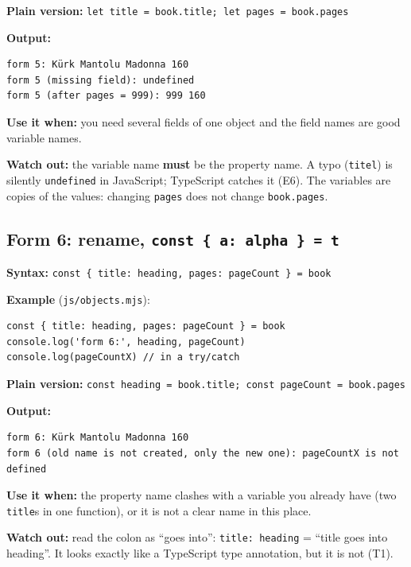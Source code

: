 \documentclass[
  10pt,
]{article}
\begin{document}
\textbf{Plain version:}
\texttt{let\ title\ =\ book.\allowbreak{}title;\ let\ pages\ =\ book.\allowbreak{}pages}

\textbf{Output:}

\begin{verbatim}
form 5: Kürk Mantolu Madonna 160
form 5 (missing field): undefined
form 5 (after pages = 999): 999 160
\end{verbatim}

\textbf{Use it when:} you need several fields of one object and the
field names are good variable names.

\textbf{Watch out:} the variable name \textbf{must} be the property
name. A typo (\texttt{titel}) is silently \texttt{undefined} in
JavaScript; TypeScript catches it (E6). The variables are copies of the
values: changing \texttt{pages} does not change
\texttt{book.\allowbreak{}pages}.

\hypertarget{form-6-rename-const--a-alpha---t}{%
\subsection{\texorpdfstring{Form 6: rename,
\texttt{const\ \{\ a:\ alpha\ \}\ =\ t}}{Form 6: rename, }}\label{form-6-rename-const--a-alpha---t}}

\textbf{Syntax:}
\texttt{const\ \{\ title:\ heading,\ pages:\ pageCount\ \}\ =\ book}

\textbf{Example} (\texttt{js/\allowbreak{}objects.\allowbreak{}mjs}):

\begin{verbatim}
const { title: heading, pages: pageCount } = book
console.log('form 6:', heading, pageCount)
console.log(pageCountX) // in a try/catch
\end{verbatim}

\textbf{Plain version:}
\texttt{const\ heading\ =\ book.\allowbreak{}title;\ const\ pageCount\ =\ book.\allowbreak{}pages}

\textbf{Output:}

\begin{verbatim}
form 6: Kürk Mantolu Madonna 160
form 6 (old name is not created, only the new one): pageCountX is not defined
\end{verbatim}

\textbf{Use it when:} the property name clashes with a variable you
already have (two \texttt{title}s in one function), or it is not a clear
name in this place.

\textbf{Watch out:} read the colon as ``goes into'':
\texttt{title:\ heading} = ``title goes into heading''. It looks exactly
like a TypeScript type annotation, but it is not (T1).
\end{document}
